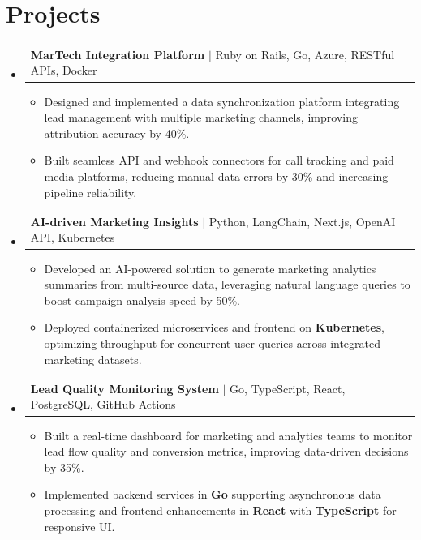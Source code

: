 \documentclass[letterpaper,11pt]{article}
\makeatletter
\newcommand{\resumeItem}[1]{
  \item\footnotesize{
    {#1 \vspace{-2pt}}
  }
}
\newcommand{\resumeProjectHeading}[2]{
    \item
    \begin{tabular*}{1.001\textwidth}{l@{\extracolsep{\fill}}r}
      \small#1 & \textbf{\small #2}\\
    \end{tabular*}\vspace{-7pt}
}
\newcommand{\resumeSubHeadingListStart}{\begin{itemize}[leftmargin=0pt, label={}]}
\newcommand{\resumeSubHeadingListEnd}{\end{itemize}}
\newcommand{\resumeItemListStart}{\begin{itemize}[leftmargin=*]}
\newcommand{\resumeItemListEnd}{\end{itemize}\vspace{-5pt}}
\makeatother
\begin{document}
\section{Projects}
    \vspace{-5pt}
    \resumeSubHeadingListStart

      \resumeProjectHeading
          {\textbf{MarTech Integration Platform} $|$ Ruby on Rails, Go, Azure, RESTful APIs, Docker}{ }
        \resumeItemListStart
            \resumeItem{Designed and implemented a data synchronization platform integrating lead management with multiple marketing channels, improving attribution accuracy by 40\%.}
            \resumeItem{Built seamless API and webhook connectors for call tracking and paid media platforms, reducing manual data errors by 30\% and increasing pipeline reliability.}
        \resumeItemListEnd
        \vspace{-12pt}

      \resumeProjectHeading
          {\textbf{AI-driven Marketing Insights} $|$ Python, LangChain, Next.js, OpenAI API, Kubernetes}{ }
        \resumeItemListStart
            \resumeItem{Developed an AI-powered solution to generate marketing analytics summaries from multi-source data, leveraging natural language queries to boost campaign analysis speed by 50\%.}
            \resumeItem{Deployed containerized microservices and frontend on \textbf{Kubernetes}, optimizing throughput for concurrent user queries across integrated marketing datasets.}
        \resumeItemListEnd
        \vspace{-12pt}

      \resumeProjectHeading
          {\textbf{Lead Quality Monitoring System} $|$ Go, TypeScript, React, PostgreSQL, GitHub Actions}{ }
        \resumeItemListStart
            \resumeItem{Built a real-time dashboard for marketing and analytics teams to monitor lead flow quality and conversion metrics, improving data-driven decisions by 35\%.}
            \resumeItem{Implemented backend services in \textbf{Go} supporting asynchronous data processing and frontend enhancements in \textbf{React} with \textbf{TypeScript} for responsive UI.}
        \resumeItemListEnd

    \resumeSubHeadingListEnd
\end{document}
